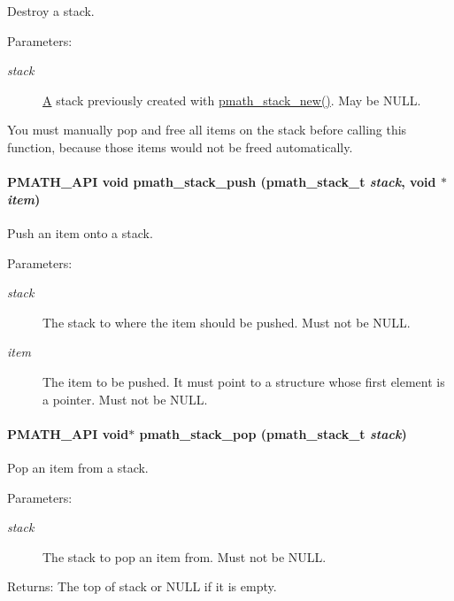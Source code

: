 Destroy a stack. 

\begin{Desc}
\item[Parameters:]
\begin{description}
\item[{\em stack}]\hyperlink{class_a}{A} stack previously created with \hyperlink{group__stacks_g4a549111f394261de5ac3cc3acda428b}{pmath\_\-stack\_\-new()}. May be NULL.\end{description}
\end{Desc}
You must manually pop and free all items on the stack before calling this function, because those items would not be freed automatically. \hypertarget{group__stacks_g56988223111a61b5b46f719e0efd546f}{
\paragraph[{pmath\_\-stack\_\-push}]{\setlength{\rightskip}{0pt plus 5cm}PMATH\_\-API void pmath\_\-stack\_\-push ({\bf pmath\_\-stack\_\-t} {\em stack}, \/  void $\ast$ {\em item})}\hfill}
\label{group__stacks_g56988223111a61b5b46f719e0efd546f}


Push an item onto a stack. 

\begin{Desc}
\item[Parameters:]
\begin{description}
\item[{\em stack}]The stack to where the item should be pushed. Must not be NULL. \item[{\em item}]The item to be pushed. It must point to a structure whose first element is a pointer. Must not be NULL. \end{description}
\end{Desc}
\hypertarget{group__stacks_g45bcd2d27a9beb76949c1283b6367dab}{
\paragraph[{pmath\_\-stack\_\-pop}]{\setlength{\rightskip}{0pt plus 5cm}PMATH\_\-API void$\ast$ pmath\_\-stack\_\-pop ({\bf pmath\_\-stack\_\-t} {\em stack})}\hfill}
\label{group__stacks_g45bcd2d27a9beb76949c1283b6367dab}


Pop an item from a stack. 

\begin{Desc}
\item[Parameters:]
\begin{description}
\item[{\em stack}]The stack to pop an item from. Must not be NULL. \end{description}
\end{Desc}
\begin{Desc}
\item[Returns:]The top of stack or NULL if it is empty. \end{Desc}
